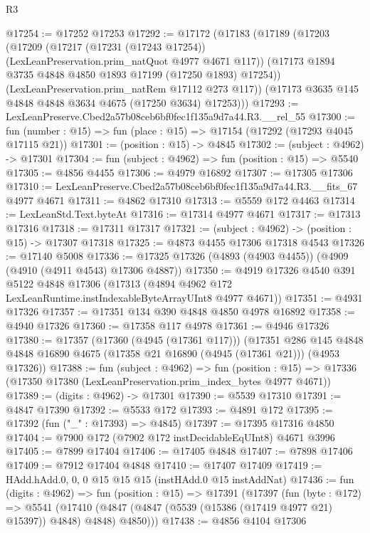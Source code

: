 \begin{lexlean}{R3}
\begin{coremodule}
@17254 := @17252 @17253
@17292 := @17172
    (@17183
      (@17189
        (@17203
          (@17209
            (@17217 (@17231 (@17243 @17254)) (LexLeanPreservation.prim_natQuot @4977 @4671 @117))
            (@17173 @1894 @3735 @4848 @4850 @1893 @17199 (@17250 @1893) @17254))
          (LexLeanPreservation.prim_natRem @17112 @273 @117))
        (@17173 @3635 @145 @4848 @4848 @3634 @4675 (@17250 @3634) @17253)))
@17293 := LexLeanPreserve.Cbed2a57b08ceb6bf0fec1f135a9d7a44.R3.__rel_55
@17300 := fun (number : @15) => fun (place : @15) => @17154 (@17292 (@17293 @4045 @17115 @21))
@17301 := (position : @15) -> @4845
@17302 := (subject : @4962) -> @17301
@17304 := fun (subject : @4962) => fun (position : @15) => @5540
@17305 := @4856 @4455
@17306 := @4979 @16892
@17307 := @17305 @17306
@17310 := LexLeanPreserve.Cbed2a57b08ceb6bf0fec1f135a9d7a44.R3.__fits_67 @4977 @4671
@17311 := @4862 @17310
@17313 := @5559 @172 @4463
@17314 := LexLeanStd.Text.byteAt
@17316 := @17314 @4977 @4671
@17317 := @17313 @17316
@17318 := @17311 @17317
@17321 := (subject : @4962) -> (position : @15) -> @17307 @17318
@17325 := @4873 @4455 @17306 @17318 @4543
@17326 := @17140 @5008
@17336 := @17325 @17326 (@4893 (@4903 @4455)) (@4909 (@4910 (@4911 @4543) @17306 @4887))
@17350 := @4919
    @17326
    @4540
    @391
    @5122
    @4848
    @17306
    (@17313 (@4894 @4962 @172 LexLeanRuntime.instIndexableByteArrayUInt8 @4977 @4671))
@17351 := @4931 @17326
@17357 := @17351 @134 @390 @4848 @4850 @4978 @16892
@17358 := @4940 @17326
@17360 := @17358 @117 @4978
@17361 := @4946 @17326
@17380 := @17357
    (@17360 (@4945 (@17361 @117)))
    (@17351
      @286
      @145
      @4848
      @4848
      @16890
      @4675
      (@17358 @21 @16890 (@4945 (@17361 @21)))
      (@4953 @17326))
@17388 := fun (subject : @4962) =>
  fun (position : @15) => @17336 (@17350 @17380 (LexLeanPreservation.prim_index_bytes @4977 @4671))
@17389 := (digits : @4962) -> @17301
@17390 := @5539 @17310
@17391 := @4847 @17390
@17392 := @5533 @172
@17393 := @4891 @172
@17395 := @17392 (fun ("_" : @17393) => @4845)
@17397 := @17395 @17316 @4850
@17404 := @7900 @172 (@7902 @172 instDecidableEqUInt8) @4671 @3996
@17405 := @7899 @17404
@17406 := @17405 @4848
@17407 := @7898 @17406
@17409 := @7912 @17404 @4848
@17410 := @17407 @17409
@17419 := HAdd.hAdd.{0, 0, 0} @15 @15 @15 (instHAdd.{0} @15 instAddNat)
@17436 := fun (digits : @4962) =>
  fun (position : @15) =>
  @17391
    (@17397
      (fun (byte : @172) =>
      @5541 (@17410 (@4847 (@4847 (@5539 (@15386 (@17419 @4977 @21) @15397)) @4848) @4848) @4850)))
@17438 := @4856 @4104 @17306

\end{coremodule}
\end{lexlean}
